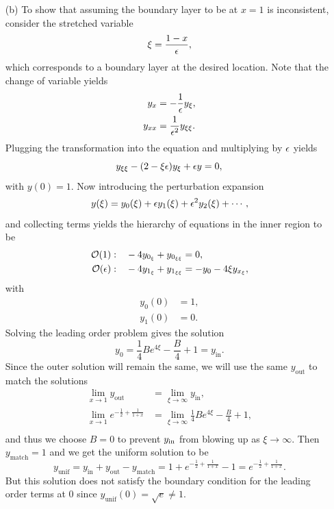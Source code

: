 \documentclass[12pt]{report}
\begin{document}
\begin{solution}
\begin{enumerate}
        \item [(b)]
        To show that assuming the boundary layer to be at $x=1$ is inconsistent, consider the stretched variable
        \[ 
            \xi = \frac{1-x}{{\epsilon}},
        \]
        which corresponds to a boundary layer at the desired location. Note that the change of variable yields
        \begin{align*}
            y_x &= - \frac{1}{{\epsilon}}y_\xi,\\
            y_{x x} &= \frac{1}{{\epsilon}^2}y_{\xi\xi}.
        \end{align*}
        Plugging the transformation into the equation and multiplying by ${\epsilon}$ yields
        \[
            y_{\xi \xi} - (2 - \xi {\epsilon})y_{\xi} + {\epsilon} y = 0,
        \] 
        with $y(0) = 1$. Now introducing the perturbation expansion
        \[ 
            y(\xi) = y_0(\xi) + {\epsilon} y_1(\xi) + {\epsilon}^2 y_2(\xi)+\cdots,
        \]
        and collecting terms yields the hierarchy of equations in the inner region to be
        \begin{align*}
            {\mathcal{O}}(1):& ~~~ -4y_{0_\xi} + y_{0_{\xi\xi}} = 0,\\
            {\mathcal{O}}({\epsilon}):& ~~~ -4y_{1_\xi} + y_{1_{\xi\xi}} = -y_0 - 4\xi y_{x_\xi},
        \end{align*}
        with
        \begin{align*}
            y_0(0) &= 1,\\
            y_1(0) &= 0.
        \end{align*}
        Solving the leading order problem gives the solution
        \[
            y_0 = \frac{1}{4} B e^{4 \xi }-\frac{B}{4}+1 = y_{\text{in}}.
        \]
        Since the outer solution will remain the same, we will use the same $y_{\text{out}}$ to match the solutions
        \begin{align*}
            \lim_{x \to 1} y_{\text{out}} &= \lim_{\xi \to \infty} y_{\text{in}},\\
            \lim_{x \to 1} e^{-\frac{1}{2} + \frac{1}{1+x}} &= \lim_{\xi \to \infty} \frac{1}{4} B e^{4 \xi }-\frac{B}{4}+1, \\ 
        \end{align*}
        and thus we choose $B = 0$ to prevent $y_\text{\text{in}}$ from blowing up as $\xi \to \infty$. Then $y_{\text{match}} = 1$ and we get the uniform solution to be
        \[ 
            y_{\text{unif}} = y_{\text{in}} + y_{\text{out}} - y_{\text{match}} = 1 + e^{-\frac{1}{2} + \frac{1}{1+x}} - 1 = e^{-\frac{1}{2} + \frac{1}{1+x}}.
        \]
        But this solution does not satisfy the boundary condition for the leading order terms at $0$ since $y_{\text{unif}}(0) = \sqrt{e} \neq 1.$



\end{enumerate}
\end{solution}
\end{document}
